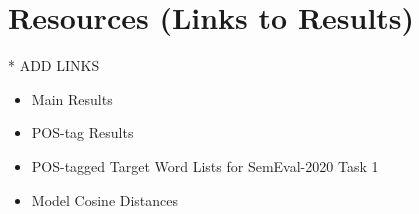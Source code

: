 \section{Resources (Links to Results)}
\label{app-resources}

* ADD LINKS
\begin{itemize}

  \item Main Results
  \item POS-tag Results
  \item POS-tagged Target Word Lists for SemEval-2020 Task 1
  \item Model Cosine Distances

\end{itemize}